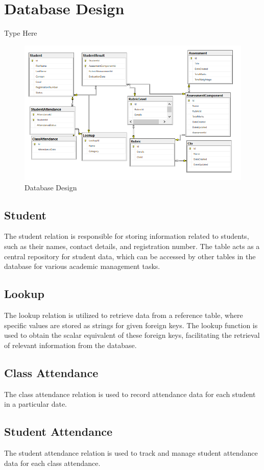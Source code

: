 \documentclass[12pt,a4paper]{article}
\begin{document}
\section{Database Design}
Type Here
\begin{figure}[H]
  \centering
    \includegraphics[scale=1]{DatabaseDesign}
  \caption{Database Design}
\end{figure}

\subsection{Student}
The student relation is responsible for storing information related to students, such as their names, contact details, and registration number. The table acts as a central repository for student data, which can be accessed by other tables in the database for various academic management tasks.
\subsection{Lookup}
The lookup relation is utilized to retrieve data from a reference table, where specific values are stored as strings for given foreign keys. The lookup function is used to obtain the scalar equivalent of these foreign keys, facilitating the retrieval of relevant information from the database.
\subsection{Class Attendance}
The class attendance relation is used to record attendance data for each student in a particular date.
\subsection{Student Attendance}
The student attendance relation is used to track and manage student attendance data for each class attendance. 
\end{document}
